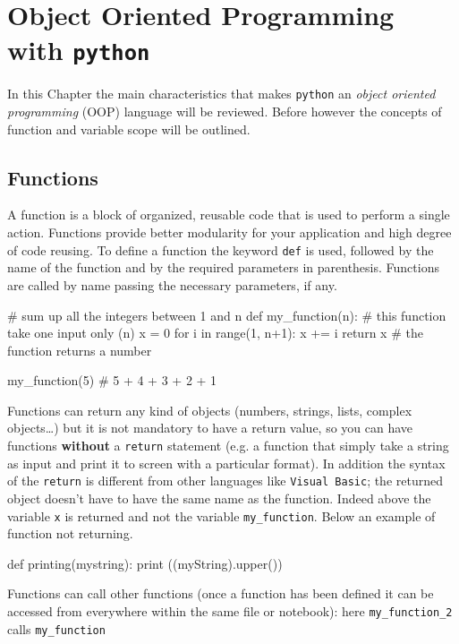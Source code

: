 \chapter{Object Oriented Programming with \texttt{python}}
\label{ch:oop}

In this Chapter the main characteristics that makes \texttt{python} an \textit{object oriented programming} (OOP) language will be reviewed. Before however the concepts of function and variable scope will be outlined.

\section{Functions}
\label{functions}

A function is a block of organized, reusable code that is used to perform a single action. Functions provide better modularity for your application and high degree of code reusing. To define a function the keyword \texttt{def} is used, followed by the name of the function and by the required parameters in parenthesis. Functions are called by name passing the necessary parameters, if any.

\begin{ipythonnon}
# sum up all the integers between 1 and n
def my_function(n): # this function take one input only (n)
    x = 0
    for i in range(1, n+1):
        x += i
    return x # the function returns a number

my_function(5) # 5 + 4 + 3 + 2 + 1
\end{ipythonnon}

Functions can return any kind of objects (numbers, strings, lists, complex objects\ldots) but it is not mandatory to have a return value, so you can have functions \textbf{without} a \texttt{return} statement (e.g. a function that simply take a string as input and print it to screen with a particular format).
In addition the syntax of the \texttt{return} is different from other languages like \texttt{Visual\ Basic}; the returned object doesn't have to have the same name as the function. Indeed above the variable \texttt{x} is returned and not the variable \texttt{my\_function}. Below an example of function not returning.

\begin{ipythonnon}
def printing(mystring):
    print ((myString).upper())
\end{ipythonnon}

Functions can call other functions (once a function has been defined it can be accessed from everywhere within the same file or notebook): here \texttt{my\_function\_2} calls \texttt{my\_function}

